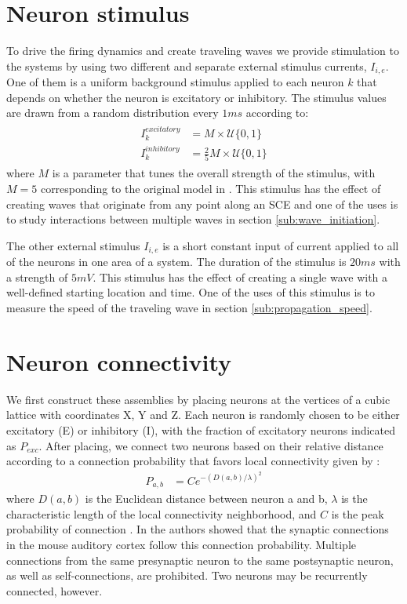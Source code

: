 \section{Neuron stimulus}
To drive the firing dynamics and create traveling waves we provide stimulation to the systems by using two different and separate external stimulus currents, $I_{i,e}$. 
One of them is a uniform background stimulus applied to each neuron $k$ that depends on whether the neuron is excitatory or inhibitory.
The stimulus values are drawn from a random distribution every $1 ms$ according to:
\begin{align}\label{eq:randomstim}
 \begin{split}
  I_k^{excitatory} &= M \times \mathcal{U}\{0,1 \} \\
  I_k^{inhibitory} &= \frac{2}{5} M \times \mathcal{U}\{0,1 \}
 \end{split}
\end{align}
where $M$ is a parameter that tunes the overall strength of the stimulus, with $M=5$ corresponding to the original model in \citep{izhikevich2003}. 
This stimulus has the effect of creating waves that originate from any point along an SCE and one of the uses is to study interactions between multiple waves in section \ref{sub:wave_initiation}.

The other external stimulus $I_{i,e}$ is a short constant input of current applied to all of the neurons in one area of a system. 
The duration of the stimulus is $20 ms$ with a strength of $5 mV$. 
This stimulus has the effect of creating a single wave with a well-defined starting location and time.
One of the uses of this stimulus is to measure the speed of the traveling wave in section \ref{sub:propagation_speed}.

\section{Neuron connectivity}
We first construct these assemblies by placing neurons at the vertices of a cubic lattice with coordinates X, Y and Z. 
Each neuron is  randomly chosen to be  either excitatory (E) or inhibitory (I), with the fraction of excitatory neurons indicated as $P_{exc}$.
After placing, we connect two neurons based on their relative distance according to a connection probability that favors local connectivity given by  \citep{maass2002}: 
\begin{align}\label{eq:connectivity}
 P_{a,b} &= C e^{-(D(a,b)/\lambda)^2}
\end{align}
where $D(a,b)$ is the Euclidean distance between neuron a and b, $\lambda$ is the characteristic length of the local connectivity neighborhood, and $C$ is the peak probability of connection .
In \citep{Levy2012} the authors showed that the synaptic connections in the mouse auditory cortex follow this connection probability.
Multiple connections from the same presynaptic neuron to the same postsynaptic neuron, as well as self-connections, are prohibited.
Two neurons may be recurrently connected, however. 

